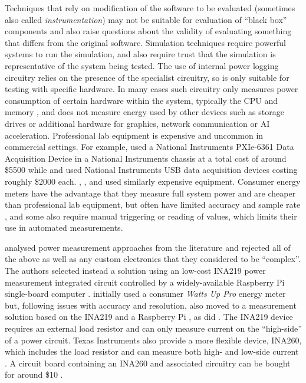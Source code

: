 Techniques that rely on modification of the software to be evaluated (sometimes also called \emph{instrumentation}) may not be suitable for evaluation of \enquote{black box} components and also raise questions about the validity of evaluating something that differs from the original software. Simulation techniques require powerful systems to run the simulation, and also require trust that the simulation is representative of the system being tested. The use of internal power logging circuitry relies on the presence of the specialist circuitry, so is only suitable for testing with specific hardware. In many cases such circuitry only measures power consumption of certain hardware within the system, typically the CPU and memory \citep{IntelCorporation2019}, and does not measure energy used by other devices such as storage drives or additional hardware for graphics, network communication or AI acceleration. Professional lab equipment is expensive and uncommon in commercial settings. For example, \citet{Dzhagaryan2016} used a National Instruments PXIe-6361 Data Acquisition Device in a National Instruments chassis at a total cost of around \$5500 while \citet{Manotas2014} and \citet{Ardito2018} used National Instruments USB data acquisition devices costing roughly \$2000 each. \citet{Rice2010}, \citet{Povoa2013}, and \citet{Milosevic2013} used similarly expensive equipment. Consumer energy meters have the advantage that they measure full system power and are cheaper than professional lab equipment, but often have limited accuracy and sample rate  \citep{Hindle2012a}, and some also require manual triggering or reading of values, which limits their use in automated measurements.

\citet{Dezfouli2018} analysed power measurement approaches from the literature and rejected all of the above as well as any custom electronics that they considered to be \enquote{complex}. The authors selected instead a solution using an low-cost INA219 power measurement integrated circuit \citep{TexasInstruments2015} controlled by a widely-available Raspberry Pi single-board computer \citep{RaspberryPi}. \citet{Hindle2012} initially used a consumer \emph{Watts Up Pro} energy meter but, following issues with accuracy and resolution, also moved to a measurement solution based on the INA219 and a Raspberry Pi \citep{Hindle2014}, as did \citet{Chowdhury2015}. The INA219 device requires an external load resistor and can only measure current on the \enquote{high-side} of a power circuit. Texas Instruments also provide a more flexible device, INA260, which includes the load resistor and can measure both high- and low-side current \citep{TexasInstruments2016}. A circuit board containing an INA260 and associated circuitry can be bought for around \$10 \citep{AdafruitINA260}.


